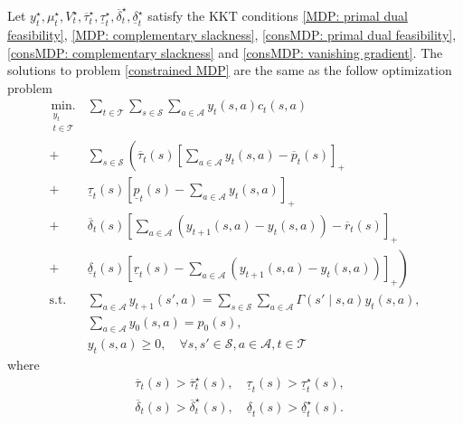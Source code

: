 \begin{theorem}\cite[Prop. 5.4.5]{bertsekas1999nonlinear}
Let \(y_t^\star, \mu_t^\star, V_t^\star, \overline{\tau}_t^\star, \underline{\tau}_t^\star, \overline{\delta}_t^\star, \underline{\delta}_t^\star\) satisfy the KKT conditions \eqref{MDP: primal dual feasibility}, \eqref{MDP: complementary slackness}, \eqref{consMDP: primal dual feasibility}, \eqref{consMDP: complementary slackness} and \eqref{consMDP: vanishing gradient}. The solutions to problem \eqref{constrained MDP} are the same as the follow optimization problem 
\begin{equation}
\begin{aligned}
\displaystyle
\underset{\substack{y_t\\t\in\mathcal{T}}}{\mbox{min.}} & \sum\limits_{t\in\mathcal{T}}\sum\limits_{s\in\mathcal{S}} \sum\limits_{a\in\mathcal{A}} y_t(s, a)c_t(s, a)\\
+&\sum_{s\in\mathcal{S}}\left(\overline{\tau}_t(s)\left[\sum_{a\in\mathcal{A}}y_t(s, a)-\overline{p}_t(s)\right]_+\right.\\
+&\underline{\tau}_t(s)\left[\underline{p}_t(s)-\sum_{a\in\mathcal{A}}y_t(s, a)\right]_+\\
+&\overline{\delta}_t(s)\left[\sum_{a\in\mathcal{A}}(y_{t+1}(s, a)-y_t(s, a))-\overline{r}_t(s)\right]_+\\
+&\left.\underline{\delta}_t(s)\left[\underline{r}_t(s)-\sum_{a\in\mathcal{A}}(y_{t+1}(s, a)-y_t(s, a))\right]_+\right)\\
\mbox{s.t.} &\sum\limits_{a\in\mathcal{A}} y_{t+1}(s', a) = \sum\limits_{s\in\mathcal{S}}\sum\limits_{a\in\mathcal{A}}\Gamma(s'\mid s, a)y_t(s, a),\\
&\sum\limits_{a\in\mathcal{A}}y_0(s, a)=p_0(s),\\
&y_t(s, a)\geq 0,\quad \forall s, s'\in\mathcal{S}, a\in\mathcal{A}, t\in\mathcal{T}
\end{aligned}\label{exact penalty MDP}
\end{equation}
where
\begin{equation}
\begin{aligned}
&\overline{\tau}_t(s)> \overline{\tau}^\star_t(s),\quad \underline{\tau}_t(s)> \underline{\tau}^\star_t(s),\\
&\overline{\delta}_t(s)> \overline{\delta}^\star_t(s), \quad \underline{\delta}_t(s)> \underline{\delta}^\star_t(s).
\end{aligned}
\end{equation}

\end{theorem}